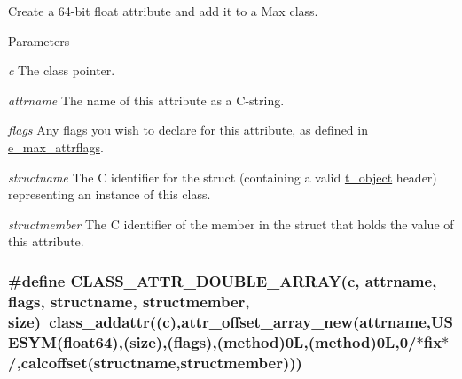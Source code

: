 Create a 64-\/bit float attribute and add it to a Max class. 
\begin{DoxyParams}{Parameters}
\item[{\em c}]The class pointer. \item[{\em attrname}]The name of this attribute as a C-\/string. \item[{\em flags}]Any flags you wish to declare for this attribute, as defined in \hyperlink{group__attr_gaf296cfc6741bb19207f6ed8062809115}{e\_\-max\_\-attrflags}. \item[{\em structname}]The C identifier for the struct (containing a valid \hyperlink{structt__object}{t\_\-object} header) representing an instance of this class. \item[{\em structmember}]The C identifier of the member in the struct that holds the value of this attribute. \end{DoxyParams}
\hypertarget{group__attr_ga4ea6da1996edbfab4d607a61a2cdd3ec}{
\subsubsection[{CLASS\_\-ATTR\_\-DOUBLE\_\-ARRAY}]{\setlength{\rightskip}{0pt plus 5cm}\#define CLASS\_\-ATTR\_\-DOUBLE\_\-ARRAY(c, \/  attrname, \/  flags, \/  structname, \/  structmember, \/  size)~class\_\-addattr((c),attr\_\-offset\_\-array\_\-new(attrname,USESYM(float64),(size),(flags),({\bf method})0L,(method)0L,0/$\ast$fix$\ast$/,calcoffset(structname,structmember)))}}
\label{group__attr_ga4ea6da1996edbfab4d607a61a2cdd3ec}


